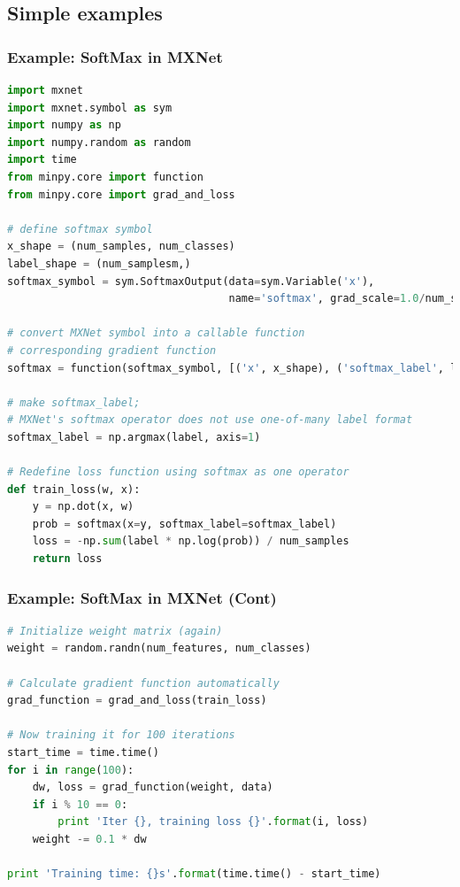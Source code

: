 \subsection{Simple examples}

\begin{frame}[fragile]
  \MyLogo
  \frametitle{Example: SoftMax in MXNet}  

\begin{lstlisting}[language=python]
import mxnet
import mxnet.symbol as sym
import numpy as np
import numpy.random as random
import time
from minpy.core import function
from minpy.core import grad_and_loss

# define softmax symbol
x_shape = (num_samples, num_classes)
label_shape = (num_samplesm,)
softmax_symbol = sym.SoftmaxOutput(data=sym.Variable('x'), 
                                   name='softmax', grad_scale=1.0/num_samples)

# convert MXNet symbol into a callable function 
# corresponding gradient function
softmax = function(softmax_symbol, [('x', x_shape), ('softmax_label', label_shape)])

# make softmax_label; 
# MXNet's softmax operator does not use one-of-many label format
softmax_label = np.argmax(label, axis=1)

# Redefine loss function using softmax as one operator
def train_loss(w, x):
    y = np.dot(x, w)
    prob = softmax(x=y, softmax_label=softmax_label)
    loss = -np.sum(label * np.log(prob)) / num_samples
    return loss
\end{lstlisting}

\end{frame}

\begin{frame}[fragile]
  \MyLogo
  \frametitle{Example: SoftMax in MXNet (Cont)}  

\ContinueLineNumber
\scriptsize{
\begin{lstlisting}[language=python]
# Initialize weight matrix (again)
weight = random.randn(num_features, num_classes)

# Calculate gradient function automatically
grad_function = grad_and_loss(train_loss)

# Now training it for 100 iterations
start_time = time.time()
for i in range(100):
    dw, loss = grad_function(weight, data)
    if i % 10 == 0:
        print 'Iter {}, training loss {}'.format(i, loss)
    weight -= 0.1 * dw
    
print 'Training time: {}s'.format(time.time() - start_time)
\end{lstlisting}
}

\vskip 100pt

\end{frame}